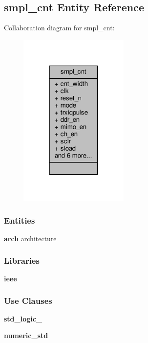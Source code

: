 \subsection{smpl\+\_\+cnt Entity Reference}
\label{classsmpl__cnt}


Collaboration diagram for smpl\+\_\+cnt\+:\nopagebreak
\begin{figure}[H]
\begin{center}
\leavevmode
\includegraphics[width=154pt]{d7/d72/classsmpl__cnt__coll__graph}
\end{center}
\end{figure}
\subsubsection*{Entities}
\begin{DoxyCompactItemize}
\item 
{\bf arch} architecture
\end{DoxyCompactItemize}
\subsubsection*{Libraries}
 \begin{DoxyCompactItemize}
\item 
{\bf ieee} 
\end{DoxyCompactItemize}
\subsubsection*{Use Clauses}
 \begin{DoxyCompactItemize}
\item 
{\bf std\+\_\+logic\+\_}   
\item 
{\bf numeric\+\_\+std}   
\end{DoxyCompactItemize}

